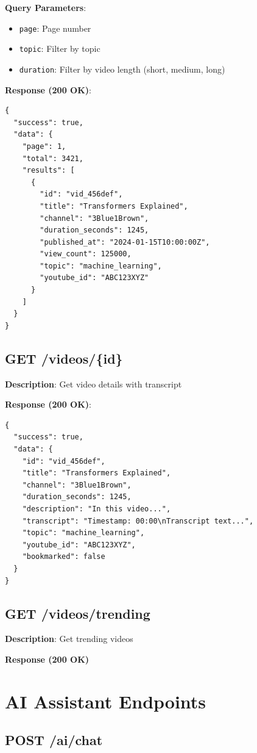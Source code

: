 \documentclass[12pt,a4paper]{report}
\begin{document}
\textbf{Query Parameters}:
\begin{itemize}
    \item \texttt{page}: Page number
    \item \texttt{topic}: Filter by topic
    \item \texttt{duration}: Filter by video length (short, medium, long)
\end{itemize}

\textbf{Response (200 OK)}:
\begin{lstlisting}
{
  "success": true,
  "data": {
    "page": 1,
    "total": 3421,
    "results": [
      {
        "id": "vid_456def",
        "title": "Transformers Explained",
        "channel": "3Blue1Brown",
        "duration_seconds": 1245,
        "published_at": "2024-01-15T10:00:00Z",
        "view_count": 125000,
        "topic": "machine_learning",
        "youtube_id": "ABC123XYZ"
      }
    ]
  }
}
\end{lstlisting}

\section{GET /videos/\{id\}}

\textbf{Description}: Get video details with transcript

\textbf{Response (200 OK)}:
\begin{lstlisting}
{
  "success": true,
  "data": {
    "id": "vid_456def",
    "title": "Transformers Explained",
    "channel": "3Blue1Brown",
    "duration_seconds": 1245,
    "description": "In this video...",
    "transcript": "Timestamp: 00:00\nTranscript text...",
    "topic": "machine_learning",
    "youtube_id": "ABC123XYZ",
    "bookmarked": false
  }
}
\end{lstlisting}

\section{GET /videos/trending}

\textbf{Description}: Get trending videos

\textbf{Response (200 OK)}


\chapter{AI Assistant Endpoints}

\section{POST /ai/chat}
\end{document}
